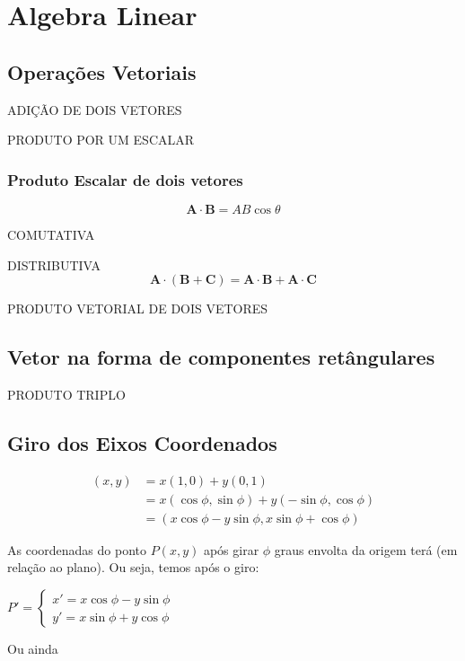 \chapter{Algebra Linear}

\section{Operações Vetoriais}
ADIÇÃO DE DOIS VETORES

PRODUTO POR UM ESCALAR

\subsection{Produto Escalar de dois vetores}

\begin{equation}\label{6.1}
    \textbf{A} \cdot \textbf{B} = AB \cos \theta
\end{equation}

COMUTATIVA

DISTRIBUTIVA
\begin{equation}\label{6.2}
    \textbf{A} \cdot (\textbf{B}+\textbf{C})=\textbf{A} \cdot \textbf{B}+\textbf{A} \cdot \textbf{C}
\end{equation}

PRODUTO VETORIAL DE DOIS VETORES

\section{Vetor na forma de componentes retângulares}

PRODUTO TRIPLO

\section{Giro dos Eixos Coordenados}\nocite{weber2003essential}

\begin{equation}\label{6.3}
\begin{split}
    (x,y)&=x(1,0)+y(0,1)\\
    &=x(\cos \phi , \sin \phi)+y(-\sin \phi , \cos \phi)\\
    &=(x\cos \phi - y\sin \phi, x \sin \phi +  \cos \phi )
    \end{split}
\end{equation}

As coordenadas do ponto $P(x,y)$ após girar $\phi$ graus envolta da origem terá (em relação ao plano). Ou seja, temos após o giro:
\begin{center}
 $P'= \begin{cases}
x'=x\cos \phi - y\sin \phi \\ 
y'= x \sin \phi +  y\cos \phi
\end{cases}$
\end{center}
Ou ainda

